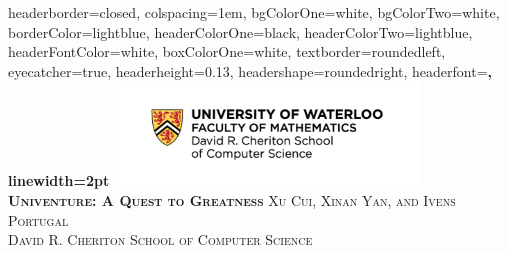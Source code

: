 \documentclass[landscape,archE,fontscale=0.29]{baposter} %
\begin{document}
\begin{poster}
{
headerborder=closed, %
colspacing=1em, %
bgColorOne=white, %
bgColorTwo=white, %
borderColor=lightblue, %
headerColorOne=black, %
headerColorTwo=lightblue, %
headerFontColor=white, %
boxColorOne=white, %
textborder=roundedleft, %
eyecatcher=true, %
headerheight=0.13\textheight, %
headershape=roundedright, %
headerfont=\Large\bf\textsc, %
linewidth=2pt %
}
%
{\includegraphics[height=7.5em]{img/Cheriton_Logo.pdf}} %
{\bf\textsc{Univenture: A Quest to Greatness}\vspace{0.1em}} %
{\vspace{-2mm}
\textsc{Xu Cui, Xinan Yan, and
    Ivens Portugal \\ David R. Cheriton School of Computer Science}} %



\end{poster}
\end{document}
